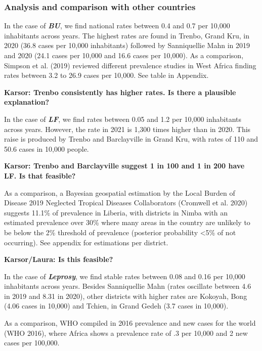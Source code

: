 \documentclass[
]{article}
\begin{document}
\hypertarget{analysis-and-comparison-with-other-countries}{%
\subsubsection{Analysis and comparison with other countries}\label{analysis-and-comparison-with-other-countries}}

In the case of \textbf{\emph{BU}}, we find national rates between 0.4 and 0.7 per 10,000 inhabitants across years. The highest rates are found in Trenbo, Grand Kru, in 2020 (36.8 cases per 10,000 inhabitants) followed by Sanniquellie Mahn in 2019 and 2020 (24.1 cases per 10,000 and 16.6 cases per 10,000). As a comparison, Simpson et al. (2019) reviewed different prevalence studies in West Africa finding rates between 3.2 to 26.9 cases per 10,000. See table in Appendix.

\textbf{Karsor: Trenbo consistently has higher rates. Is there a plausible explanation?}

In the case of \textbf{\emph{LF}}, we find rates between 0.05 and 1.2 per 10,000 inhabitants across years. However, the rate in 2021 is 1,300 times higher than in 2020. This raise is produced by Trenbo and Barclayville in Grand Kru, with rates of 110 and 50.6 cases in 10,000 people.

\textbf{Karsor: Trenbo and Barclayville suggest 1 in 100 and 1 in 200 have LF. Is that feasible?}

As a comparison, a Bayesian geospatial estimation by the Local Burden of Disease 2019 Neglected Tropical Diseases Collaborators (Cromwell et al. 2020) suggests 11.1\% of prevalence in Liberia, with districts in Nimba with an estimated prevalence over 30\% where many areas in the country are unlikely to be below the 2\% threshold of prevalence (posterior probability \textless5\% of not occurring). See appendix for estimations per district.

\textbf{Karsor/Laura: Is this feasible?}

In the case of \textbf{\emph{Leprosy}}, we find stable rates between 0.08 and 0.16 per 10,000 inhabitants across years. Besides Sanniquellie Mahn (rates oscillate between 4.6 in 2019 and 8.31 in 2020), other districts with higher rates are Kokoyah, Bong (4.06 cases in 10,000) and Tchien, in Grand Gedeh (3.7 cases in 10,000).

As a comparison, WHO compiled in 2016 prevalence and new cases for the world (WHO 2016), where Africa shows a prevalence rate of .3 per 10,000 and 2 new cases per 100,000.
\end{document}
